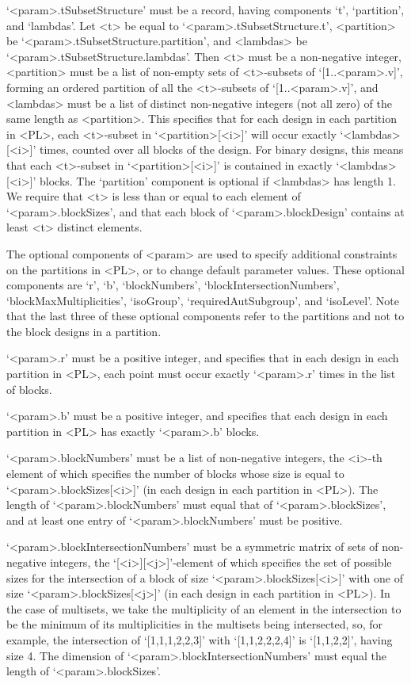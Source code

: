 `<param>.tSubsetStructure' must be a record, having
components `t', `partition', and `lambdas'. Let <t> be
equal to `<param>.tSubsetStructure.t', <partition> be
`<param>.tSubsetStructure.partition', and <lambdas> be
`<param>.tSubsetStructure.lambdas'.  Then <t> must be a non-negative
integer, <partition> must be a list of non-empty sets of <t>-subsets of
`[1..<param>.v]', forming an ordered partition of all the <t>-subsets of
`[1..<param>.v]', and <lambdas> must be a list of distinct non-negative
integers (not all zero) of the same length as <partition>. This specifies
that for each design in each partition in <PL>, each <t>-subset in
`<partition>[<i>]' will occur exactly `<lambdas>[<i>]' times, counted
over all blocks of the design.  For binary designs, this means that each
<t>-subset in `<partition>[<i>]' is contained in exactly `<lambdas>[<i>]'
blocks.  The `partition' component is optional if <lambdas> has length 1.
We require that <t> is less than or equal to each element of
`<param>.blockSizes', and that each block of `<param>.blockDesign'
contains at least <t> distinct elements.

The optional components of <param> are used to specify additional
constraints on the partitions in <PL>, or to change default parameter
values. These optional components are `r', `b', `blockNumbers',
`blockIntersectionNumbers', `blockMaxMultiplicities', `isoGroup',
`requiredAutSubgroup', and `isoLevel'. Note that the last three of these
optional components refer to the partitions and not to the block designs
in a partition.

`<param>.r' must be a positive integer, and specifies that in each design
in each partition in <PL>, each point must occur exactly `<param>.r'
times in the list of blocks.

`<param>.b' must be a positive integer, and specifies that each design
in each partition in <PL> has exactly `<param>.b' blocks.

`<param>.blockNumbers' must be a list of non-negative integers, the <i>-th
element of which specifies the number of blocks whose size is equal to
`<param>.blockSizes[<i>]' (in each design in each partition in <PL>). The
length of `<param>.blockNumbers' must equal that of `<param>.blockSizes',
and at least one entry of `<param>.blockNumbers' must be positive.

`<param>.blockIntersectionNumbers' must be a symmetric matrix of sets
of non-negative integers, the `[<i>][<j>]'-element of which specifies
the set of possible sizes for the intersection of a block of size
`<param>.blockSizes[<i>]' with one of size `<param>.blockSizes[<j>]'
(in each design in each partition in <PL>). In the case of multisets, we
take the multiplicity of an element in the intersection to be the minimum
of its multiplicities in the multisets being intersected, so, for example,
the intersection of `[1,1,1,2,2,3]' with `[1,1,2,2,2,4]' is `[1,1,2,2]',
having size 4.  The dimension of `<param>.blockIntersectionNumbers'
must equal the length of `<param>.blockSizes'.

